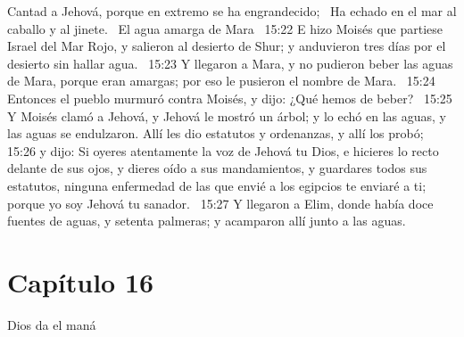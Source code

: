 Cantad a Jehová, porque en extremo se ha engrandecido;  
Ha echado en el mar al caballo y al jinete.  
El agua amarga de Mara  
15:22 E hizo Moisés que partiese Israel del Mar Rojo, y salieron al desierto de Shur; y anduvieron tres días por el desierto sin hallar agua.  
15:23 Y llegaron a Mara, y no pudieron beber las aguas de Mara, porque eran amargas; por eso le pusieron el nombre de Mara.  
15:24 Entonces el pueblo murmuró contra Moisés, y dijo: ¿Qué hemos de beber?  
15:25 Y Moisés clamó a Jehová, y Jehová le mostró un árbol; y lo echó en las aguas, y las aguas se endulzaron. Allí les dio estatutos y ordenanzas, y allí los probó;  
15:26 y dijo: Si oyeres atentamente la voz de Jehová tu Dios, e hicieres lo recto delante de sus ojos, y dieres oído a sus mandamientos, y guardares todos sus estatutos, ninguna enfermedad de las que envié a los egipcios te enviaré a ti; porque yo soy Jehová tu sanador.  
15:27 Y llegaron a Elim, donde había doce fuentes de aguas, y setenta palmeras; y acamparon allí junto a las aguas.  
\section*{Capítulo 16}
Dios da el maná  

